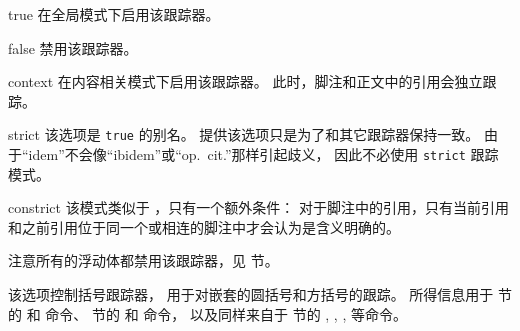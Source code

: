 \begin{optionlist}
\begin{valuelist}
\item[true] %
在全局模式下启用该跟踪器。
\item[false] %
禁用该跟踪器。
\item[context] %
在内容相关模式下启用该跟踪器。
此时，脚注和正文中的引用会独立跟踪。
\item[strict] %
该选项是 \texttt{true} 的别名。
提供该选项只是为了和其它跟踪器保持一致。
由于“idem”不会像“ibidem”或“op.~cit.”那样引起歧义，
因此不必使用 \texttt{strict} 跟踪模式。
\item[constrict] %
该模式类似于 ，只有一个额外条件：
对于脚注中的引用，只有当前引用和之前引用位于同一个或相连的脚注中才会认为是含义明确的。
\end{valuelist}

注意所有的浮动体都禁用该跟踪器，见  节。



该选项控制括号跟踪器，
用于对嵌套的圆括号和方括号的跟踪。
所得信息用于  节的   和  命令、
 节的  和  命令，
以及同样来自于  节的 , , ,  等命令。



\end{optionlist}
